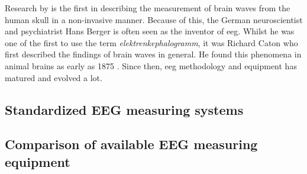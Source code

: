 \lipsum[1-5]

Research by \citet{human_eeg_discovery} is the first in describing the measurement of brain waves from the human skull in a non-invasive manner.
Because of this, the German neuroscientist and psychiatrist Hans Berger is often seen as the inventor of \gls{eeg}.
Whilst he was one of the first to use the term \textit{elektrenkephalogramm}, it was Richard Caton who first described the findings of brain waves in general.
He found this phenomena in animal brains as early as 1875 \citep{first_eeg}.
Since then, \gls{eeg} methodology and equipment has matured and evolved a lot.


\subsection{Standardized EEG measuring systems}
\label{subsec:biomedical_signals_measuring_standardization}

\lipsum[1-4]


\subsection{Comparison of available EEG measuring equipment}
\label{subsec:biomedical_signals_measuring_equipment}

\lipsum[1-5]


